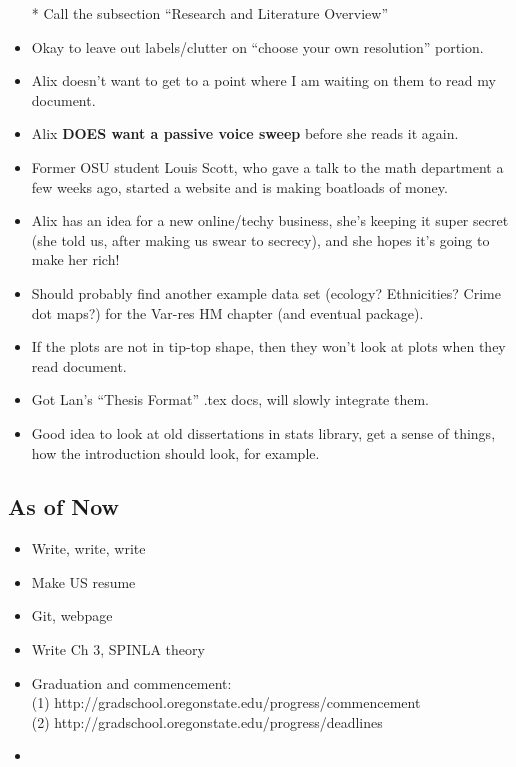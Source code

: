 \documentclass{article}
\begin{document}
\begin{itemize}
* Call the subsection ``Research and Literature Overview''
\item Okay to leave out labels/clutter on ``choose your own resolution'' portion.
\item Alix doesn't want to get to a point where I am waiting on them to read my document.
\item Alix {\bf DOES want a passive voice sweep} before she reads it again.
\item Former OSU student Louis Scott, who gave a talk to the math department a few weeks ago, started a website and is making boatloads of money.
\item Alix has an idea for a new online/techy business, she's keeping it super secret (she told us, after making us swear to secrecy), and she hopes it's going to make her rich!
\item Should probably find another example data set (ecology? Ethnicities? Crime dot maps?) for the Var-res HM chapter (and eventual package).
\item If the plots are not in tip-top shape, then they won't look at plots when they read document.
\item Got Lan's ``Thesis Format'' .tex docs, will slowly integrate them.
\item Good idea to look at old dissertations in stats library, get a sense of things, how the introduction should look, for example.
\end{itemize}

\subsection*{As of Now}
\begin{itemize}
\item Write, write, write
\item Make US resume
\item Git, webpage
\item Write Ch 3, SPINLA theory
\item Graduation and commencement: \\
(1) http://gradschool.oregonstate.edu/progress/commencement \\ 
(2) http://gradschool.oregonstate.edu/progress/deadlines \\
\item 
\end{itemize}

% 

\end{document}
